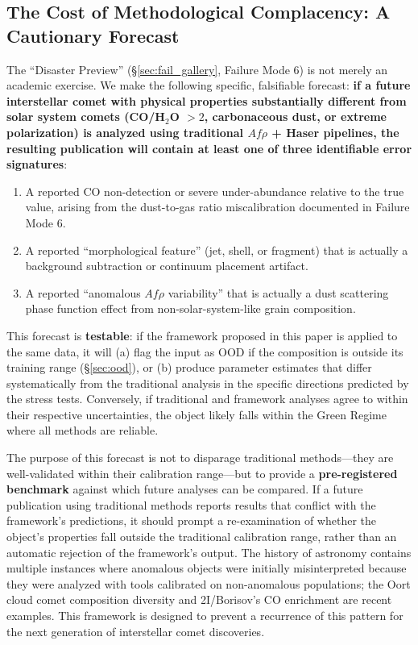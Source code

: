 \documentclass[usenatbib]{mnras}
\begin{document}
\subsection{The Cost of Methodological Complacency: A Cautionary Forecast}

The ``Disaster Preview'' (\S\ref{sec:fail_gallery}, Failure Mode 6) is not merely an academic exercise. We make the following specific, falsifiable forecast: \textbf{if a future interstellar comet with physical properties substantially different from solar system comets (CO/H$_2$O $> 2$, carbonaceous dust, or extreme polarization) is analyzed using traditional $Af\rho$ + Haser pipelines, the resulting publication will contain at least one of three identifiable error signatures}:

\begin{enumerate}
    \item A reported CO non-detection or severe under-abundance relative to the true value, arising from the dust-to-gas ratio miscalibration documented in Failure Mode 6.
    \item A reported ``morphological feature'' (jet, shell, or fragment) that is actually a background subtraction or continuum placement artifact.
    \item A reported ``anomalous $Af\rho$ variability'' that is actually a dust scattering phase function effect from non-solar-system-like grain composition.
\end{enumerate}

This forecast is \textbf{testable}: if the framework proposed in this paper is applied to the same data, it will (a) flag the input as OOD if the composition is outside its training range (\S\ref{sec:ood}), or (b) produce parameter estimates that differ systematically from the traditional analysis in the specific directions predicted by the stress tests. Conversely, if traditional and framework analyses agree to within their respective uncertainties, the object likely falls within the Green Regime where all methods are reliable.

The purpose of this forecast is not to disparage traditional methods---they are well-validated within their calibration range---but to provide a \textbf{pre-registered benchmark} against which future analyses can be compared. If a future publication using traditional methods reports results that conflict with the framework's predictions, it should prompt a re-examination of whether the object's properties fall outside the traditional calibration range, rather than an automatic rejection of the framework's output. The history of astronomy contains multiple instances where anomalous objects were initially misinterpreted because they were analyzed with tools calibrated on non-anomalous populations; the Oort cloud comet composition diversity and 2I/Borisov's CO enrichment are recent examples. This framework is designed to prevent a recurrence of this pattern for the next generation of interstellar comet discoveries.
\end{document}
